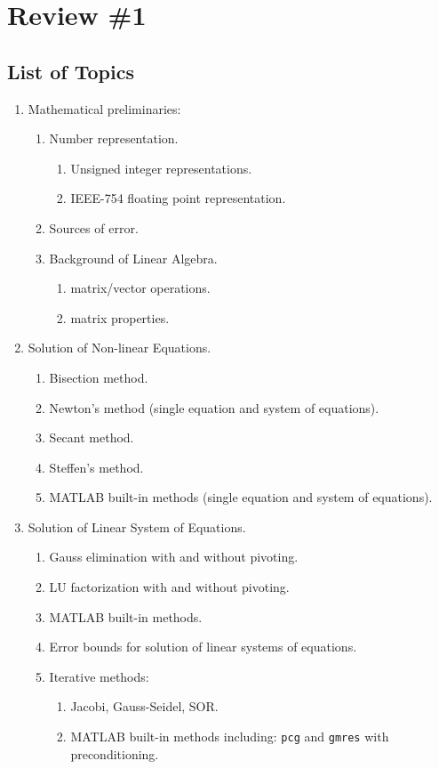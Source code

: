 \chapter{Review \#1}
\label{ch:rev1n}
\begin{fullwidth}

\section{List of Topics}
\begin{enumerate}
\item Mathematical preliminaries:
\begin{enumerate}
\item Number representation.
\begin{enumerate}
\item Unsigned integer representations.
\item IEEE-754 floating point representation.
\end{enumerate}
\item Sources of error.

\item Background of Linear Algebra.
\begin{enumerate}
\item matrix/vector operations.
\item matrix properties.
\end{enumerate}
\end{enumerate}

\item Solution of Non-linear Equations.
\begin{enumerate}
\item Bisection method.
\item Newton's method (single equation and system of equations).
\item Secant method.
\item Steffen's method.
\item MATLAB built-in methods (single equation and system of equations).
\end{enumerate}

\item Solution of Linear System of Equations.

\begin{enumerate}
\item Gauss elimination with and without pivoting.
\item LU factorization with and without pivoting.
\item MATLAB built-in methods.
\item Error bounds for solution of linear systems of equations.
\item Iterative methods:
\begin{enumerate}
\item Jacobi, Gauss-Seidel, SOR.
\item MATLAB built-in methods including: \lstinline[style=myMatlab]{pcg} and \lstinline[style=myMatlab]{gmres} with preconditioning.
\end{enumerate}
\end{enumerate}


\end{enumerate}
\end{fullwidth}

